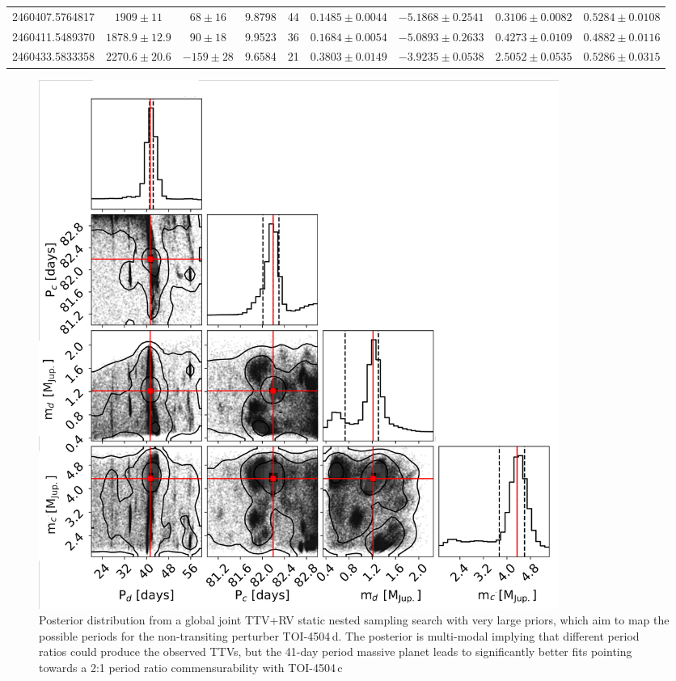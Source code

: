 \documentclass[twocolumn,twocolappendix]{aastex631}
\begin{document}
\begin{table}
\begin{rotatetable*}
\begin{center}
{\begin{tabular}{ccccccccc}
2460407.5764817 & $1909 \pm 11$     & $68 \pm 16$   & 9.8798 & 44 & $0.1485 \pm 0.0044$ & $-5.1868 \pm 0.2541$ & $0.3106 \pm 0.0082$ & $0.5284 \pm 0.0108$\\
2460411.5489370 & $1878.9 \pm 12.9$ & $90 \pm 18$   & 9.9523 & 36 & $0.1684 \pm 0.0054$ & $-5.0893 \pm 0.2633$ & $0.4273 \pm 0.0109$ & $0.4882 \pm 0.0116$\\
2460433.5833358 & $2270.6 \pm 20.6$ & $-159 \pm 28$ & 9.6584 & 21 & $0.3803 \pm 0.0149$ & $-3.9235 \pm 0.0538$ & $2.5052 \pm 0.0535$ & $0.5286 \pm 0.0315$\\
\hline \hline
\end{tabular}}
\end{center}
\end{rotatetable*}
\end{table}

\begin{figure}
    
    \includegraphics[width=17cm]{2pl_TTV+RVs_Ns_Large_priors_P_m.pdf}
    \caption{Posterior distribution from a global joint TTV+RV static nested sampling search with very large priors, which aim to map the possible periods for the non-transiting perturber TOI-4504\,d. The posterior is multi-modal implying that different period ratios could produce the observed TTVs, but the 41-day period massive planet leads to significantly better fits pointing towards a 2:1 period ratio commensurability with TOI-4504\,c}
    \label{Nest_samp_ttv}
    
\end{figure} 
\end{document}
